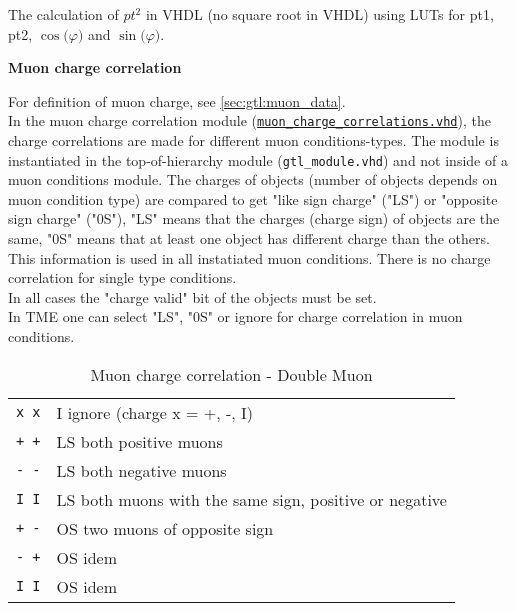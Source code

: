 The calculation of ${pt^2}$ in VHDL (no square root in VHDL) using LUTs for pt1, pt2, $\cos($$\varphi$$)$ and $\sin($$\varphi$$)$.


\textbf{Muon charge correlation}
\label{sec:gtl:muon_charge_correlation_module}

For definition of muon charge, see \ref{sec:gtl:muon_data}.\\
In the muon charge correlation module (\href{https://github.com/cms-l1-globaltrigger/mp7_ugt_legacy/tree/master/firmware/hdl/gt_mp7_core/gtl_fdl_wrapper/gtl/muon_charge_correlations.vhd}{\texttt{muon\_charge\_correlations.vhd}}), the charge correlations are made for different muon conditions-types. The module is instantiated in the top-of-hierarchy module (\texttt{gtl\_module.vhd})
and not inside of a muon conditions module.
The charges of objects (number of objects depends on muon condition type) are compared to get "like sign charge" ("LS") or "opposite sign charge" ("0S"), "LS" means that the charges (charge sign)
of objects are the same, "0S" means that at least one object has different charge than the others. This information is used in all instatiated muon conditions.
There is no charge correlation for single type conditions.\\
In all cases the "charge valid" bit of the objects must be set.\\
In TME one can select "LS", "0S" or ignore for charge correlation in muon conditions.\\

\begin{table}[ht]
\caption{Muon charge correlation - Double Muon}
\vspace{5mm}
\centering
\begin{tabular}{|c|l|}\hline
\verb|x x| & I ignore (charge x = +, -, I) \\
\verb|+ +| & LS both positive muons \\
\verb|- -| & LS both negative muons \\
\verb|I I| & LS both muons with the same sign, positive or negative \\
\verb|+ -| & OS two muons of opposite sign \\
\verb|- +| & OS idem \\
\verb|I I| & OS idem \\\hline
\end{tabular}
\label{tab:gtl:muon_charge_corr_double}
\end{table}

